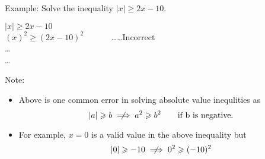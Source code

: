 \begin{bxExample}{}    
    Example: Solve the inequality $ \lvert x \rvert \geqslant 2x-10. $


\tcbline 



\begin{warningEnv}
     $ \lvert x \rvert \geqslant 2x-10 $ \\
     $ (x)^2 \geqslant (2x-10)^2 \quad \quad \quad $ \dots \dots Incorrect \\
     \dots \\
     \dots     
\end{warningEnv}

\tcbline


Note:
\begin{itemize}
       \item[] Above is one common error in solving absolute value inequlities as 
                \[    \lvert a \rvert \geqslant b       \centernot\implies     a^2 \geqslant b^2  \quad  \quad \text{if b is negative.} \]    
    
      \item[]  For example, $x=0$ is a valid value in the above inequality but
                \[     \lvert 0 \rvert \geqslant -10       \centernot\implies     0^2 \geqslant (-10)^2 \] 
\end{itemize}






    
\end{bxExample}
























